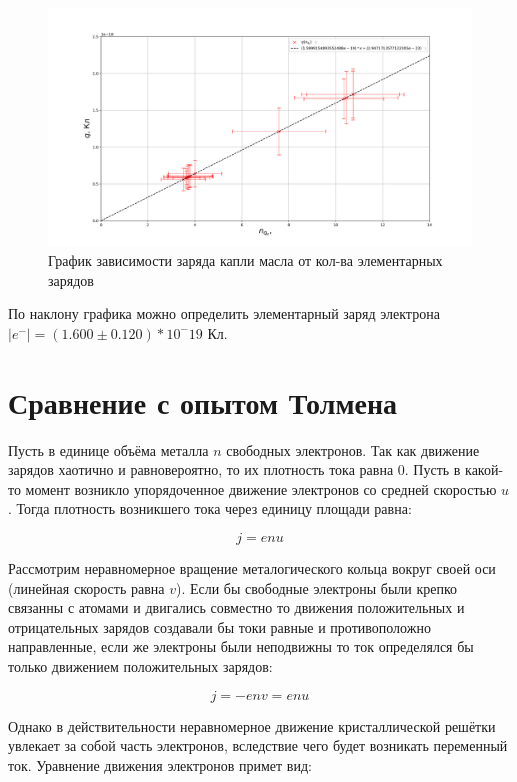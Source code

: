 \documentclass{lab}
\begin{document}
\begin{figure}[H]
    \centering
    \includegraphics[width=\textwidth]{graph.png}
    \caption{График зависимости заряда капли масла от кол-ва элементарных зарядов}
    \label{graph:q_n}
\end{figure}

По наклону графика можно определить элементарный заряд электрона $|e^{-}| = (1.600 \pm 0.120) * 10^-19$ Кл.

\section{Сравнение с опытом Толмена}

Пусть в единице объёма металла $n$ свободных электронов. Так как движение зарядов хаотично и равновероятно, то их плотность тока равна 0. Пусть в какой-то момент возникло упорядоченное движение электронов со средней скоростью $u$. Тогда плотность возникшего тока через единицу площади равна:

\begin{equation}
    j = enu
\end{equation}

Рассмотрим неравномерное вращение металогического кольца вокруг своей оси (линейная скорость равна $v$). Если бы свободные электроны были крепко связанны с атомами и двигались совместно то движения положительных и отрицательных зарядов создавали бы токи равные и противоположно направленные, если же электроны были неподвижны то ток определялся бы только движением положительных зарядов:

\begin{equation}
    j = -env = enu
\end{equation}

Однако в действительности неравномерное движение кристаллической решётки увлекает за собой часть электронов, вследствие чего будет возникать переменный ток.
Уравнение движения электронов примет вид:
\end{document}
